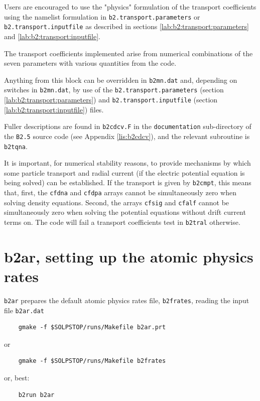\documentclass[a4paper,10pt]{report}
\begin{document}
Users are encouraged to use the "physics" formulation of the
transport coefficients using the namelist formulation in
{\tt b2.transport.parameters} or
{\tt b2.transport.inputfile} as described in
sections \ref{lab:b2:transport:parameters} and \ref{lab:b2:transport:inputfile}.

The transport coefficients implemented arise from numerical combinations
of the seven parameters with various quantities from the code.

Anything from this block can be overridden in {\tt b2mn.dat} and,
depending on switches in {\tt b2mn.dat}, by use of the
{\tt b2.transport.parameters} (section \ref{lab:b2:transport:parameters}) and
{\tt b2.transport.inputfile} (section \ref{lab:b2:transport:inputfile}) files.

Fuller descriptions are found in {\tt b2cdcv.F} in the {\tt documentation}
sub-directory of the {\tt B2.5} source code (see Appendix \ref{lis:b2cdcv}), and the
relevant subroutine is {\tt b2tqna}.

It is important, for numerical stability reasons, to provide mechanisms by which some
particle transport and radial current (if the electric potential equation is being solved)
can be established. If the transport is given by
{\tt b2cmpt}, this means that, first, the {\tt cfdna} and {\tt cfdpa} arrays
cannot be simultaneously zero when solving density equations. Second, the arrays
{\tt cfsig} and {\tt cfalf} cannot be
simultaneously zero when solving the potential equations without drift current terms on.
The code will fail a transport coefficients test in {\tt b2tral} otherwise.

\newpage
\section{b2ar, setting up the atomic physics rates}
\label{sec:b2ar}

{\tt b2ar} prepares the default atomic physics rates file, {\tt b2frates},
reading the input file {\tt b2ar.dat}

\begin{verbatim}
    gmake -f $SOLPSTOP/runs/Makefile b2ar.prt
\end{verbatim}
or
\begin{verbatim}
    gmake -f $SOLPSTOP/runs/Makefile b2frates
\end{verbatim}
or, best:
\begin{verbatim}
    b2run b2ar
\end{verbatim}
\end{document}
